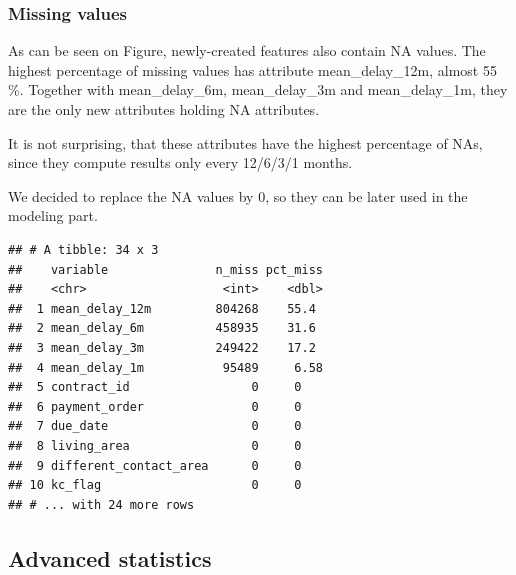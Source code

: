 \documentclass[
]{article}
\begin{document}
\hypertarget{missing-values-1}{%
\subsubsection{Missing values}\label{missing-values-1}}

As can be seen on Figure, newly-created features also contain NA values. The highest percentage of missing values has attribute mean\_delay\_12m, almost 55 \%. Together with mean\_delay\_6m, mean\_delay\_3m and mean\_delay\_1m, they are the only new attributes holding NA attributes.

It is not surprising, that these attributes have the highest percentage of NAs, since they compute results only every 12/6/3/1 months.

We decided to replace the NA values by 0, so they can be later used in the modeling part.

\begin{verbatim}
## # A tibble: 34 x 3
##    variable               n_miss pct_miss
##    <chr>                   <int>    <dbl>
##  1 mean_delay_12m         804268    55.4 
##  2 mean_delay_6m          458935    31.6 
##  3 mean_delay_3m          249422    17.2 
##  4 mean_delay_1m           95489     6.58
##  5 contract_id                 0     0   
##  6 payment_order               0     0   
##  7 due_date                    0     0   
##  8 living_area                 0     0   
##  9 different_contact_area      0     0   
## 10 kc_flag                     0     0   
## # ... with 24 more rows
\end{verbatim}

\hypertarget{advanced-statistics}{%
\subsection{Advanced statistics}\label{advanced-statistics}}
\end{document}
